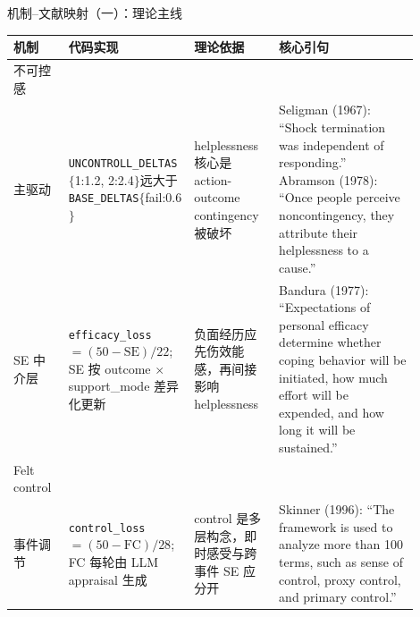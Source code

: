 \documentclass[aspectratio=169]{beamer}
\begin{document}
\begin{frame}[t]{机制--文献映射（一）：理论主线}
\scriptsize
\setlength{\tabcolsep}{2.5pt}
\renewcommand{\arraystretch}{1.15}
\centering
\begin{tabular}{
    L{0.13\linewidth}
    L{0.24\linewidth}
    L{0.20\linewidth}
    L{0.33\linewidth}
}
\toprule
\textbf{机制} & \textbf{代码实现} & \textbf{理论依据} & \textbf{核心引句} \\
\midrule
不可控感\\主驱动
&
\texttt{UNCONTROLL\_DELTAS}$\{$1:1.2, 2:2.4$\}$远大于 \texttt{BASE\_DELTAS}$\{$fail:0.6$\}$
&
helplessness 核心是 action-outcome contingency 被破坏
&
Seligman (1967): ``Shock termination was independent of responding.'' \newline
Abramson (1978): ``Once people perceive noncontingency, they attribute their helplessness to a cause.'' \\

\midrule
SE 中介层
&
\texttt{efficacy\_loss} $= (50{-}\text{SE})/22$; SE 按 outcome $\times$ support\_mode 差异化更新
&
负面经历应先伤效能感，再间接影响 helplessness
&
Bandura (1977): ``Expectations of personal efficacy determine whether coping behavior will be initiated, how much effort will be expended, and how long it will be sustained.'' \\

\midrule
Felt control\\事件调节
&
\texttt{control\_loss} $= (50{-}\text{FC})/28$; FC 每轮由 LLM appraisal 生成
&
control 是多层构念，即时感受与跨事件 SE 应分开
&
Skinner (1996): ``The framework is used to analyze more than 100 terms, such as sense of control, proxy control, and primary control.'' \\
\bottomrule
\end{tabular}
\end{frame}
\end{document}
